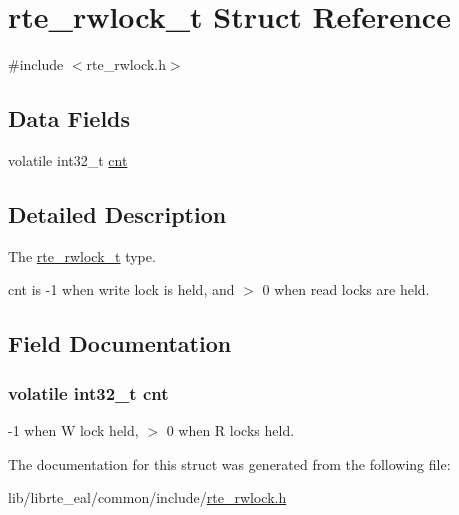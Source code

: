 \hypertarget{structrte__rwlock__t}{}\section{rte\+\_\+rwlock\+\_\+t Struct Reference}
\label{structrte__rwlock__t}


{\ttfamily \#include $<$rte\+\_\+rwlock.\+h$>$}

\subsection*{Data Fields}
\begin{DoxyCompactItemize}
\item 
volatile int32\+\_\+t \hyperlink{structrte__rwlock__t_aa6a259db31091b35fd46d2eba71a1112}{cnt}
\end{DoxyCompactItemize}


\subsection{Detailed Description}
The \hyperlink{structrte__rwlock__t}{rte\+\_\+rwlock\+\_\+t} type.

cnt is -\/1 when write lock is held, and $>$ 0 when read locks are held. 

\subsection{Field Documentation}
\hypertarget{structrte__rwlock__t_aa6a259db31091b35fd46d2eba71a1112}{}
\subsubsection[{cnt}]{\setlength{\rightskip}{0pt plus 5cm}volatile int32\+\_\+t cnt}\label{structrte__rwlock__t_aa6a259db31091b35fd46d2eba71a1112}
-\/1 when W lock held, $>$ 0 when R locks held. 

The documentation for this struct was generated from the following file\+:\begin{DoxyCompactItemize}
\item 
lib/librte\+\_\+eal/common/include/\hyperlink{rte__rwlock_8h}{rte\+\_\+rwlock.\+h}\end{DoxyCompactItemize}
